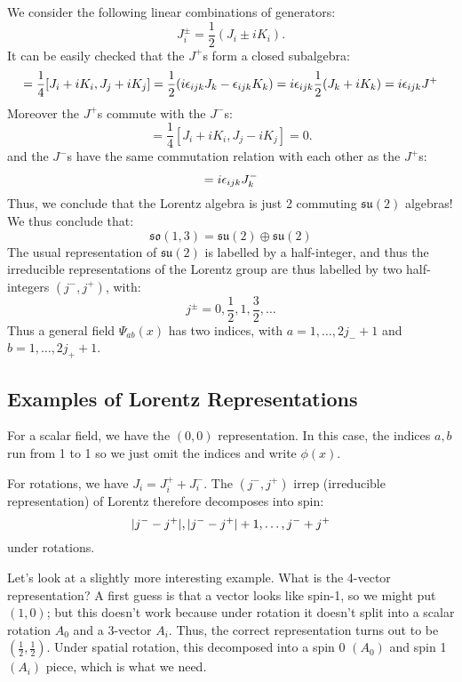 We consider the following linear combinations of generators:
\begin{equation}
    J_i^\pm = \frac{1}{2}(J_i \pm iK_i).
\end{equation}
It can be easily checked that the $J^+$s form a closed subalgebra:
\begin{equation}
    [J_i^+, J_j^+] = \frac{1}{4}[J_i + iK_i, J_j + iK_j] = \frac{1}{2}(i\e_{ijk}J_k - \e_{ijk}K_k) = i\e_{ijk}\frac{1}{2}(J_k + iK_k) = i\e_{ijk}J^+
\end{equation}
Moreover the $J^+$s commute with the $J^-$s:
\begin{equation}
    [J_i^+, J_j^-] = \frac{1}{4}[J_i + iK_i, J_j - iK_j] = 0.
\end{equation}
and the $J^-$s have the same commutation relation with each other as the $J^+$s:
\begin{equation}
    [J_i^-, J_j^-] = i\e_{ijk}J^-_k
\end{equation}
Thus, we conclude that the Lorentz algebra is just 2 commuting $\mathfrak{su}(2)$ algebras! We thus conclude that:
\begin{equation}
    \mathfrak{so}(1, 3) = \mathfrak{su}(2) \oplus \mathfrak{su}(2)
\end{equation}
The usual representation of $\mathfrak{su}(2)$ is labelled by a half-integer, and thus the irreducible representations of the Lorentz group are thus labelled by two half-integers $(j^-, j^+)$, with:
\begin{equation}
    j^\pm = 0, \frac{1}{2}, 1, \frac{3}{2}, \ldots
\end{equation}
Thus a general field $\Psi_{ab}(x)$ has two indices, with $a = 1, \ldots, 2j_- + 1$ and $b = 1, \ldots, 2j_+ + 1$.

\subsection{Examples of Lorentz Representations}
For a scalar field, we have the $(0, 0)$ representation. In this case, the indices $a, b$ run from 1 to 1 so we just omit the indices and write $\phi(x)$.

For rotations, we have $J_i = J^+_i + J^-_i$. The $(j^-, j^+)$ irrep (irreducible representation) of Lorentz therefore decomposes into spin:
\begin{equation}
    \lvert j^- - j^+ \rvert, \lvert j^- - j^+ \rvert + 1, \ldots, j^- + j^+
\end{equation}
under rotations.

Let's look at a slightly more interesting example. What is the 4-vector representation? A first guess is that a vector looks like spin-1, so we might put $(1, 0)$; but this doesn't work because under rotation it doesn't split into a scalar rotation $A_0$ and a 3-vector $A_i$. Thus, the correct representation turns out to be $(\frac{1}{2}, \frac{1}{2})$. Under spatial rotation, this decomposed into a spin 0 $(A_0)$ and spin 1 $(A_i)$ piece, which is what we need.


